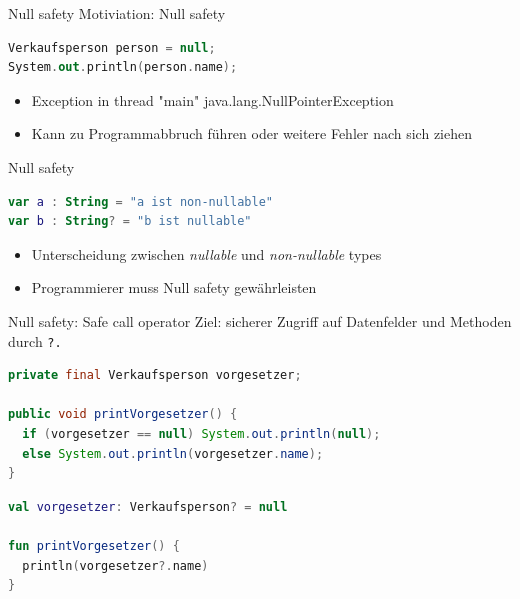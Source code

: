 \documentclass{beamer}
\begin{document}

\begin{frame}[fragile]{Null safety}
  Motiviation: Null safety
  \pause\vspace{1cm}
  \begin{lstlisting}[language=Kotlin, title=Java Beispiel, xleftmargin=1em]
Verkaufsperson person = null;
System.out.println(person.name);
  \end{lstlisting}
  \pause\vspace{1cm}
  \begin{itemize}[<+->]
    \item Exception in thread "main" java.lang.NullPointerException %
    \item Kann zu Programmabbruch führen oder weitere Fehler nach sich ziehen
  \end{itemize}
\end{frame}

\begin{frame}[fragile]{Null safety}
  \begin{lstlisting}[language=Kotlin]
var a : String = "a ist non-nullable"
var b : String? = "b ist nullable"
  \end{lstlisting}
  \pause \vspace{1cm}
  \begin{itemize}
    \item Unterscheidung zwischen \textit{nullable} und \textit{non-nullable} types
    \item Programmierer muss Null safety gewährleisten
  \end{itemize}
\end{frame}

\begin{frame}[fragile]{Null safety: Safe call operator}
  Ziel: sicherer Zugriff auf Datenfelder und Methoden durch \texttt{?.}
  \pause
  \begin{lstlisting}[language=Java, title=in Java]
private final Verkaufsperson vorgesetzer;

public void printVorgesetzer() {
  if (vorgesetzer == null) System.out.println(null);
  else System.out.println(vorgesetzer.name);
}
  \end{lstlisting}
  \pause
  \begin{lstlisting}[language=Kotlin, title=in Kotlin]
val vorgesetzer: Verkaufsperson? = null

fun printVorgesetzer() {
  println(vorgesetzer?.name)
} 
  \end{lstlisting}
\end{frame}
\end{document}
